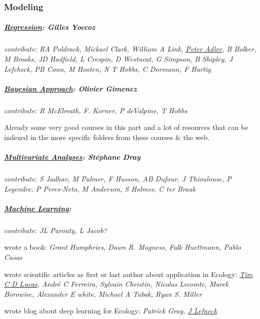 \documentclass[
]{article}
\begin{document}
\hypertarget{modeling}{%
\subsubsection{Modeling}\label{modeling}}

\hypertarget{regression-gilles-yoccoz}{%
\subparagraph{\texorpdfstring{\href{modeling_regression.html}{Regression}:
\textbf{Gilles
Yoccoz}}{Regression: Gilles Yoccoz}}\label{regression-gilles-yoccoz}}

\emph{contribute: RA Poldrack, Mickael Clark, William A Link,
\href{https://qcnr.usu.edu/directory/adler_peter}{Peter Adler}, B
Bolker, M Brooks, JD Hadfield, L Crespin, D Westneat, G Simpson, B
Shipley, J Lefcheck, PB Conn, M Hooten, N T Hobbs, C Dormann, F Hartig}

\hypertarget{bayesian-approach-olivier-gimenez}{%
\subparagraph{\texorpdfstring{\href{modeling_bayesian.html}{Bayesian
Approach}: \textbf{Olivier
Gimenez}}{Bayesian Approach: Olivier Gimenez}}\label{bayesian-approach-olivier-gimenez}}

\emph{contribute: R McElreath, F. Korner, P deValpine, T Hobbs}

Already some very good courses in this part and a lot of resources that
can be indexed in the more specific folders from these courses \& the
web.

\hypertarget{multivariate-analyses-stuxe9phane-dray}{%
\subparagraph{\texorpdfstring{\href{modeling_multivariate.html}{Multivariate
Analyses}: \textbf{Stéphane
Dray}}{Multivariate Analyses: Stéphane Dray}}\label{multivariate-analyses-stuxe9phane-dray}}

\emph{contribute: S Jadhav, M Palmer, F Husson, AB Dufour, J Thioulouse,
P Legendre, P Peres-Neto, M Anderson, S Holmes, C ter Braak }

\hypertarget{machine-learning}{%
\subparagraph{\texorpdfstring{\href{modeling_machinelearning.html}{Machine
Learning}:}{Machine Learning:}}\label{machine-learning}}

\emph{contribute: JL Parouty, L Jacob? }

wrote a book: \emph{Grant Humphries, Dawn R. Magness, Falk Huettmann,
Pablo Casas}

wrote scientific articles as first or last author about application in
Ecology: \emph{\href{https://timcdlucas.github.io/}{Tim C D Lucas},
André C Ferreira, Sylvain Christin, Nicolas Lecomte, Marek Borowiec,
Alexander E white, Michael A Tabak, Ryan S. Miller}

wrote blog about deep learning for Ecology: \emph{Patrick Gray,
\href{https://jonlefcheck.net/}{J Lefneck}}
\end{document}
